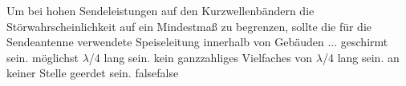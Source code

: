     {Um bei hohen Sendeleistungen auf den Kurzwellenbändern die Störwahrscheinlichkeit auf ein Mindestmaß zu begrenzen, sollte die für die Sendeantenne verwendete Speiseleitung innerhalb von Gebäuden ...}
    {geschirmt sein.}
    {möglichst $\lambda$/4 lang sein.}
    {kein ganzzahliges Vielfaches von $\lambda$/4 lang sein.}
    {an keiner Stelle geerdet sein.}
    {false}{false}